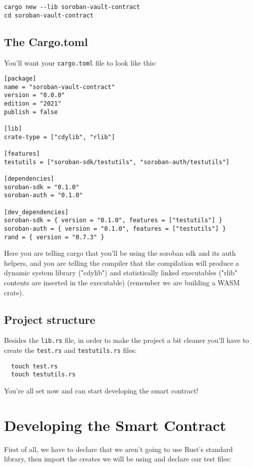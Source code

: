 \documentclass{article}
\newcommand{\inl}[1]{\lstinline{#1}}
\begin{document}
\begin{lstlisting}
cargo new --lib soroban-vault-contract
cd soroban-vault-contract
\end{lstlisting}


\subsection{The Cargo.toml}
You'll want your \inl{cargo.toml} file to look like this:

\begin{lstlisting}
[package]
name = "soroban-vault-contract"
version = "0.0.0"
edition = "2021"
publish = false

[lib]
crate-type = ["cdylib", "rlib"]

[features]
testutils = ["soroban-sdk/testutils", "soroban-auth/testutils"]

[dependencies]
soroban-sdk = "0.1.0"
soroban-auth = "0.1.0"

[dev_dependencies]
soroban-sdk = { version = "0.1.0", features = ["testutils"] }
soroban-auth = { version = "0.1.0", features = ["testutils"] }
rand = { version = "0.7.3" }

\end{lstlisting}

Here you are telling cargo that you'll be using the soroban sdk and its auth helpers, and you are telling the compiler that the compilation will produce a dynamic system library ("cdylib") and statistically linked executables ("rlib" contents are inserted in the executable) (remember we are building a WASM crate).

\subsection{Project structure}
Besides the \inl{lib.rs} file, in order to make the project a bit cleaner you'll have to create the \inl{test.rs} and \inl{testutils.rs} files:

\begin{lstlisting}
  touch test.rs
  touch testutils.rs
\end{lstlisting}

You're all set now and can start developing the smart contract!

\section{Developing the Smart Contract}

First of all, we have to declare that we aren't going to use Rust's standard library, then import the creates we will be using and declare our test files:
\end{document}
